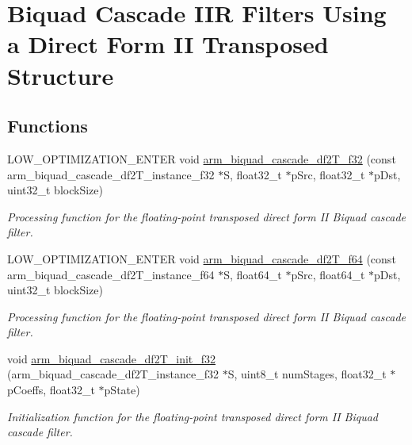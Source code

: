 \hypertarget{group__BiquadCascadeDF2T}{}\section{Biquad Cascade I\+IR Filters Using a Direct Form II Transposed Structure}
\label{group__BiquadCascadeDF2T}
\subsection*{Functions}
\begin{DoxyCompactItemize}
\item 
L\+O\+W\+\_\+\+O\+P\+T\+I\+M\+I\+Z\+A\+T\+I\+O\+N\+\_\+\+E\+N\+T\+ER void \hyperlink{group__BiquadCascadeDF2T_ga114f373fbc16a314e9f293c7c7649c7f}{arm\+\_\+biquad\+\_\+cascade\+\_\+df2\+T\+\_\+f32} (const arm\+\_\+biquad\+\_\+cascade\+\_\+df2\+T\+\_\+instance\+\_\+f32 $\ast$S, float32\+\_\+t $\ast$p\+Src, float32\+\_\+t $\ast$p\+Dst, uint32\+\_\+t block\+Size)
\begin{DoxyCompactList}\small\item\em Processing function for the floating-\/point transposed direct form II Biquad cascade filter. \end{DoxyCompactList}\item 
L\+O\+W\+\_\+\+O\+P\+T\+I\+M\+I\+Z\+A\+T\+I\+O\+N\+\_\+\+E\+N\+T\+ER void \hyperlink{group__BiquadCascadeDF2T_gaa8735dda5f3f36d0936283794c2aa771}{arm\+\_\+biquad\+\_\+cascade\+\_\+df2\+T\+\_\+f64} (const arm\+\_\+biquad\+\_\+cascade\+\_\+df2\+T\+\_\+instance\+\_\+f64 $\ast$S, float64\+\_\+t $\ast$p\+Src, float64\+\_\+t $\ast$p\+Dst, uint32\+\_\+t block\+Size)
\begin{DoxyCompactList}\small\item\em Processing function for the floating-\/point transposed direct form II Biquad cascade filter. \end{DoxyCompactList}\item 
void \hyperlink{group__BiquadCascadeDF2T_ga70eaddf317a4a8bde6bd6a97df67fedd}{arm\+\_\+biquad\+\_\+cascade\+\_\+df2\+T\+\_\+init\+\_\+f32} (arm\+\_\+biquad\+\_\+cascade\+\_\+df2\+T\+\_\+instance\+\_\+f32 $\ast$S, uint8\+\_\+t num\+Stages, float32\+\_\+t $\ast$p\+Coeffs, float32\+\_\+t $\ast$p\+State)
\begin{DoxyCompactList}\small\item\em Initialization function for the floating-\/point transposed direct form II Biquad cascade filter. \end{DoxyCompactList}\item 

\end{DoxyCompactItemize}
